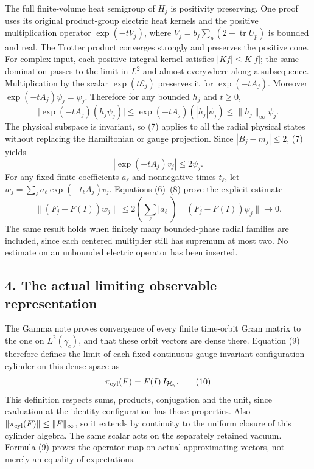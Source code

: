 \documentclass[
  11pt,
]{article}
\begin{document}
The full finite-volume heat semigroup of \(H_j\) is positivity
preserving. One proof uses its original product-group electric heat
kernels and the positive multiplication operator \(\exp(-tV_j)\), where
\(V_j=b_j\sum_p(2-\operatorname{tr}U_p)\) is bounded and real. The
Trotter product converges strongly and preserves the positive cone. For
complex input, each positive integral kernel satisfies \(|Kf|\le K|f|\);
the same domination passes to the limit in \(L^2\) and almost everywhere
along a subsequence. Multiplication by the scalar
\(\exp(t\mathcal E_j)\) preserves it for \(\exp(-tA_j)\). Moreover
\(\exp(-tA_j)\psi_j=\psi_j\). Therefore for any bounded \(h_j\) and
\(t\ge0\), \[
 \big|\exp(-tA_j)(h_j\psi_j)\big|
 \le\exp(-tA_j)(|h_j|\psi_j)
 \le\|h_j\|_\infty\psi_j .
 \tag{7}
\] The physical subspace is invariant, so (7) applies to all the radial
physical states without replacing the Hamiltonian or gauge projection.
Since \(|B_j-m_j|\le2\), (7) yields \[
 |\exp(-tA_j)v_j|\le2\psi_j .
 \tag{8}
\] For any fixed finite coefficients \(a_\ell\) and nonnegative times
\(t_\ell\), let \(w_j=\sum_\ell a_\ell\exp(-t_\ell A_j)v_j\). Equations
(6)--(8) prove the explicit estimate \[
 \|(F_j-F(I))w_j\|
 \le2\left(\sum_\ell|a_\ell|\right)
       \|(F_j-F(I))\psi_j\|\longrightarrow0 .
 \tag{9}
\] The same result holds when finitely many bounded-phase radial
families are included, since each centered multiplier still has supremum
at most two. No estimate on an unbounded electric operator has been
inserted.

\subsection{4. The actual limiting observable
representation}\label{weak-coupling-part-6-the-actual-limiting-observable-representation}

The Gamma note proves convergence of every finite time-orbit Gram matrix
to the one on \(L^2(\gamma_c)\), and that these orbit vectors are dense
there. Equation (9) therefore defines the limit of each fixed continuous
gauge-invariant configuration cylinder on this dense space as \[
 \pi_{\rm cyl}(F)=F(I)\,I_{\mathcal H_\gamma}.
 \tag{10}
\] This definition respects sums, products, conjugation and the unit,
since evaluation at the identity configuration has those properties.
Also \(\|\pi_{\rm cyl}(F)\|\le\|F\|_\infty\), so it extends by
continuity to the uniform closure of this cylinder algebra. The same
scalar acts on the separately retained vacuum. Formula (9) proves the
operator map on actual approximating vectors, not merely an equality of
expectations.
\end{document}
